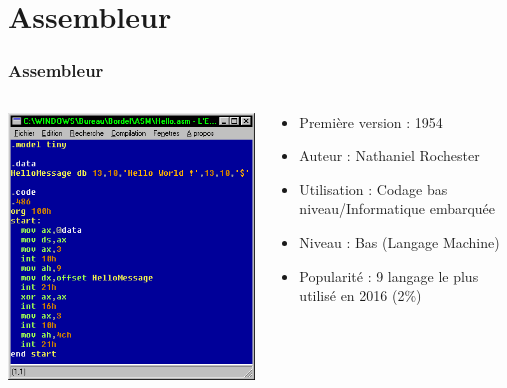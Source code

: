\documentclass{beamer}
\begin{document}
	\section{Assembleur}
	\begin{frame}
	\frametitle{Assembleur}
	\begin{columns}
	\begin{column}{3cm}
				\includegraphics[scale=0.3]{asm.png}
	\end{column}
	\begin{column}{7cm}
		\begin{itemize}
			\item Première version : 1954
			\item Auteur : 	Nathaniel Rochester
			\item Utilisation : Codage bas niveau/Informatique embarquée
			\item Niveau : Bas (Langage Machine)
			\item Popularité : 9 langage le plus utilisé en 2016 (2\%)
		\end{itemize}
	\end{column}
	\end{columns}
	\end{frame}
	
\end{document}
